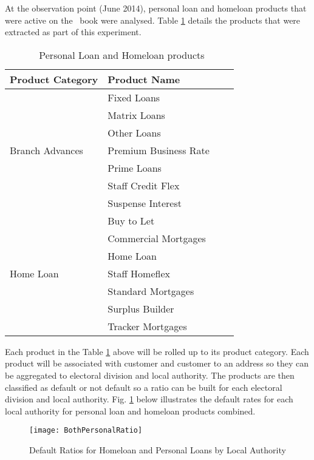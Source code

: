 At the observation point (June 2014), personal loan and homeloan products that were active on the \subjectname\ book were analysed. Table \ref{table:AIB_Products} details the products that were extracted as part of this experiment.

\begin{table}[H]
	\centering
		\small
			\begin{tabular}{llll}
			\hline
			\textbf{Product Category} & \textbf{Product Name} \\ \hline
			     & Fixed Loans \\ 
			    & Matrix Loans \\ 
			     & Other Loans \\ 
			Branch Advances     & Premium Business Rate \\ 
			     & Prime Loans \\ 
			     & Staff Credit Flex \\ 
					& Suspense Interest \\ \hline
			           & Buy to Let \\ 
			           & Commercial Mortgages \\ 
			           & Home Loan \\ 
			Home Loan           & Staff Homeflex \\ 
			           & Standard Mortgages \\ 
			           & Surplus Builder \\ 	
			           & Tracker Mortgages \\ \hline		
		\end{tabular}
	\caption{\subjectname\ Personal Loan and Homeloan products}
	\label{table:AIB_Products}
\end{table}

Each product in the Table \ref{table:AIB_Products} above will be rolled up to its product category. Each product will be associated with customer and customer to an address so they can be aggregated to electoral division and local authority. The products are then classified as default or not default so a ratio can be built for each electoral division and local authority. Fig. \ref{fig:BothPersonalRatio} below illustrates the default rates for each local authority for personal loan and homeloan products combined. 

\begin{figure}[H]
	\texttt{[image: BothPersonalRatio]}
	\caption{Default Ratios for Homeloan and Personal Loans by Local Authority}
	\label{fig:BothPersonalRatio}
\end{figure}

